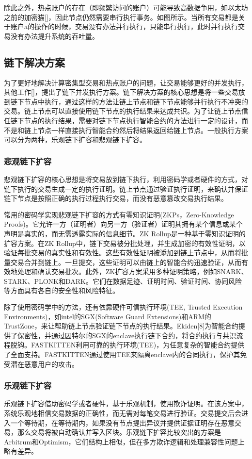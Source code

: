 除此之外，热点账户的存在（即频繁访问的账户）可能导致高数据争用，如以太坊之前的加密猫[]，因此节点仍然需要串行执行事务。如图所示。当所有交易都是关于账户a的操作的时候，交易没有办法并行执行，只能串行执行，此时并行执行交易没有办法提升系统的吞吐量。

\subsection{链下解决方案}
为了更好地解决计算密集型交易和热点账户的问题，让交易能够更好的并发执行，其他工作[]，提出了链下并发执行方案。链下解决方案的核心思想是将一些交易放到链下节点中执行，通过这样的方法让链上节点和链下节点能够并行执行不冲突的交易。链上节点可以直接使用链下节点的执行结果来达成共识。为了让链上节点信任链下节点的执行结果，需要对链下节点执行智能合约的方法进行一定的设计，而不是和链上节点一样直接执行智能合约然后将结果返回给链上节点。一般执行方案可以分为两种，乐观链下扩容和悲观链下扩容。

\subsubsection{悲观链下扩容}
悲观链下扩容的核心思想是将交易放到链下执行，利用密码学或者硬件的方式，对链下执行的交易生成一定的执行证明。链上节点通过验证执行证明，来确认并保证链下节点是按照正确的执行过程执行交易，而没有恶意篡改交易执行结果。

常用的密码学实现悲观链下扩容的方式有零知识证明(ZKPs，Zero-Knowledge Proofs)。它允许一方（证明者）向另一方（验证者）证明其拥有某个信息或某个声明是真实的，而无需透露实际的信息细节。ZK Rollup是一种基于零知识证明的扩容方案。在ZK Rollup中，链下交易被分批处理，并生成加密的有效性证明，以验证每批交易的真实性和有效性。这些有效性证明被添加到链上节点中，从而将批量交易合并到链上。一旦提交，这些证明可以由链上的智能合约迅速验证，从而有效地处理和确认交易批次。此外，ZK扩容方案采用多种证明策略，例如SNARK、STARK、PLONK和DARK。它们在数据足迹、证明时间、验证时间、协同风险等方面具有各自的安全性和风险特征。

除了使用密码学中的方法，还有依靠硬件可信执行环境(TEE, Trusted Execution Environments)，如intel的SGX(Software Guard Extensions)和ARM的TrustZone，来让帮助链上节点验证链下节点的执行结果。Ekiden[8]为智能合约提供了保密性，并通过因特尔的SGX的enclave执行链下合约，将合约执行与共识流程脱钩。FASTKITTEN利用可靠的执行环境(TEE)，为任意复杂的智能合约提供了全面支持。FASTKITTEN通过使用TEE来隔离enclave内的合同执行，保护其免受潜在恶意用户的攻击。

\subsubsection{乐观链下扩容}
乐观链下扩容借助密码学或者硬件，基于乐观机制，使用欺诈证明。在该方案中，系统乐观地相信交易数据的正确性，而无需对每笔交易进行验证。交易提交后会进入一个等待期，在等待期内，如果没有节点提出异议并提供证据证明存在恶意交易，那么交易将被自动确认并写入区块。乐观链下扩容比较突出的方案是Arbitrum和Optimism，它们结构上相似，但在多方欺诈逻辑和处理兼容性问题上略有差异。

